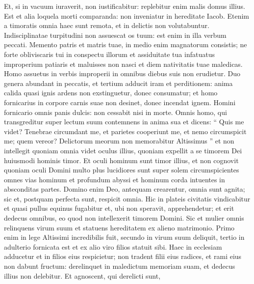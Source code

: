\begin{biblechapter}
\begin{biblechapter}
\begin{biblechapter}
\begin{biblechapter}
\begin{biblechapter}
\begin{biblechapter}
\begin{biblechapter}
\begin{biblechapter}
\begin{biblechapter}
\begin{biblechapter}
\begin{biblechapter}
\begin{biblechapter}
\begin{biblechapter}
\begin{biblechapter}
\begin{biblechapter}
\begin{biblechapter}
\begin{biblechapter}
\begin{biblechapter}
\begin{biblechapter}
\begin{biblechapter}
\begin{biblechapter}
\begin{biblechapter}
\begin{biblechapter}
 \verse Et, si in vacuum iuraverit, non iustificabitur:
 replebitur enim malis domus illius.
 \verse Est et alia loquela morti comparanda:
 non inveniatur in hereditate Iacob.
 \verse Etenim a timoratis omnia haec sunt remota,
 et in delictis non volutabuntur.
 \verse Indisciplinatae turpitudini non assuescat os tuum:
 est enim in illa verbum peccati.
 \verse Memento patris et matris tuae,
 in medio enim magnatorum consistis;
 \verse ne forte obliviscaris tui in conspectu illorum
 et assiduitate tua infatuatus improperium patiaris
 et maluisses non nasci et diem nativitatis tuae maledicas.
 \verse Homo assuetus in verbis improperii
 in omnibus diebus suis non erudietur.
 \verse Duo genera abundant in peccatis,
 et tertium adducit iram et perditionem:
 \verse anima calida quasi ignis ardens
 non exstinguetur, donec consumatur;
 \verse et homo fornicarius in corpore carnis suae
 non desinet, donec incendat ignem.
 \verse Homini fornicario omnis panis dulcis:
 non cessabit nisi in morte.
 \verse Omnis homo, qui transgreditur super lectum suum
 contemnens in anima sua et dicens: “ Quis me videt?
 \verse Tenebrae circumdant me, et parietes cooperiunt me,
 et nemo circumspicit me; quem vereor?
 Delictorum meorum non memorabitur Altissimus ”
 \verse et non intellegit quoniam omnia videt oculus illius,
 quoniam expellit a se timorem Dei huiusmodi hominis timor.
 Et oculi hominum sunt timor illius,
 \verse et non cognovit quoniam oculi Domini
 multo plus lucidiores sunt super solem
 circumspicientes omnes vias hominum et profundum abyssi
 et hominum corda intuentes in absconditas partes.
 \verse Domino enim Deo, antequam crearentur, omnia sunt agnita;
 sic et, postquam perfecta sunt, respicit omnia.
 \verse Hic in plateis civitatis vindicabitur
 et quasi pullus equinus fugabitur
 et, ubi non speravit, apprehendetur;
 \verse et erit dedecus omnibus,
 eo quod non intellexerit timorem Domini.
 \verse Sic et mulier omnis relinquens virum suum
 et statuens hereditatem ex alieno matrimonio.
 \verse Primo enim in lege Altissimi incredibilis fuit,
 secundo in virum suum deliquit,
 tertio in adulterio fornicata est
 et ex alio viro filios statuit sibi.
 \verse Haec in ecclesiam adducetur
 et in filios eius respicietur;
 \verse non tradent filii eius radices,
 et rami eius non dabunt fructum:
 \verse derelinquet in maledictum memoriam suam,
 et dedecus illius non delebitur.
 \verse Et agnoscent, qui derelicti sunt,

\end{biblechapter}
\end{biblechapter}
\end{biblechapter}
\end{biblechapter}
\end{biblechapter}
\end{biblechapter}
\end{biblechapter}
\end{biblechapter}
\end{biblechapter}
\end{biblechapter}
\end{biblechapter}
\end{biblechapter}
\end{biblechapter}
\end{biblechapter}
\end{biblechapter}
\end{biblechapter}
\end{biblechapter}
\end{biblechapter}
\end{biblechapter}
\end{biblechapter}
\end{biblechapter}
\end{biblechapter}
\end{biblechapter}
